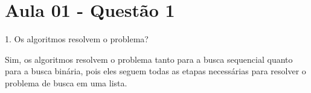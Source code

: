 \section{Aula 01 - Questão 1}

1. Os algoritmos resolvem o problema?

Sim, os algoritmos resolvem o problema tanto para a busca sequencial quanto para a busca binária, pois eles seguem todas as etapas necessárias para resolver o problema de busca em uma lista.
